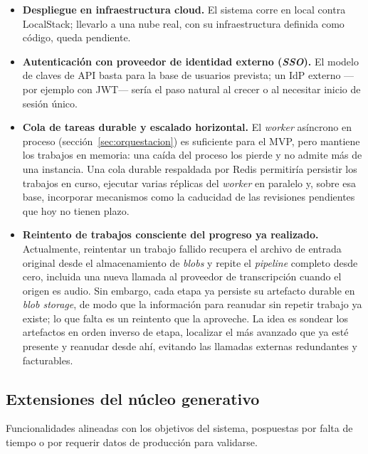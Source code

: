 \begin{itemize}
  \item \textbf{Despliegue en infraestructura cloud.} El sistema corre en local contra LocalStack;
        llevarlo a una nube real, con su infraestructura definida como código, queda pendiente.

  \item \textbf{Autenticación con proveedor de identidad externo (\textit{SSO}).} El modelo de
        claves de \ac{API} basta para la base de usuarios prevista; un IdP externo —por ejemplo con
        JWT— sería el paso natural al crecer o al necesitar inicio de sesión único.

  \item \textbf{Cola de tareas durable y escalado horizontal.} El \textit{worker} asíncrono en
        proceso (sección~\ref{sec:orquestacion}) es suficiente para el \ac{MVP}, pero mantiene los
        trabajos en memoria: una caída del proceso los pierde y no admite más de una instancia. Una
        cola durable respaldada por Redis permitiría persistir los trabajos en curso, ejecutar
        varias réplicas del \textit{worker} en paralelo y, sobre esa base, incorporar mecanismos
        como la caducidad de las revisiones pendientes que hoy no tienen plazo.

  \item \textbf{Reintento de trabajos consciente del progreso ya realizado.} Actualmente, reintentar
        un trabajo fallido recupera el archivo de entrada original desde el almacenamiento de
        \textit{blobs} y repite el \textit{pipeline} completo desde cero, incluida una nueva llamada
        al proveedor de transcripción cuando el origen es audio. Sin embargo, cada etapa ya persiste
        su artefacto durable en \textit{blob storage}, de modo que la información para reanudar sin
        repetir trabajo ya existe; lo que falta es un reintento que la aproveche. La idea es sondear
        los artefactos en orden inverso de etapa, localizar el más avanzado que ya esté presente y
        reanudar desde ahí, evitando las llamadas externas redundantes y facturables.
\end{itemize}

\subsection{Extensiones del núcleo generativo}

Funcionalidades alineadas con los objetivos del sistema, pospuestas por falta de tiempo o por
requerir datos de producción para validarse.

